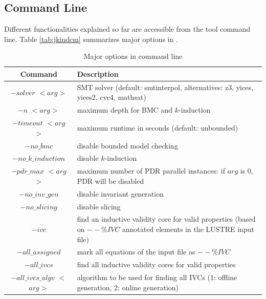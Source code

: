\subsection{Command Line}
Different \jkind functionalities explained so far are accessible from the tool command line. Table \ref{tab:jkindcm} summarizes major options in \jkind.

\begin{table}
  \caption{Major options in \jkind command line}
   \vspace{-0.1in}
  \centering
\begin{tabularx}{\linewidth}{|c|L|}
\hline
    Command & Description\\
  \hline\hline
  \small{$-solver $ $<$$arg$$>$} & \small{SMT solver (default: smtinterpol, alternatives: z3, yices, yices2, cvc4, mathsat)}\\[0.1ex]\hline
  \small{$-n $ $<$$arg$$>$ } & \small{maximum depth for BMC and $k$-induction} \\[0.1ex]
 \small{ $-timeout $ $<$$arg$$>$ }& \small{maximum runtime in seconds (default: unbounded)}\\[0.1ex]\hline
  \small{$-no\_bmc$} & \small{disable bounded model checking} \\
  \small{$-no\_k\_induction $} & \small{ disable $k$-induction} \\
  \small{$-pdr\_max$ $<$$arg$$>$} &\small{ maximum number of PDR parallel instances: if $arg$ is 0, PDR will be disabled} \\[0.1ex]
  \small{$-no\_inv\_gen $} & \small{disable invariant generation} \\
  \small{$-no\_slicing $} & \small{disable slicing} \\[0.1ex]\hline
  \small{$-ivc$ }& \small{find an inductive validity core for valid properties (based on $--\%IVC$ annotated  elements in the LUSTRE input file)} \\
  \small{$-all\_assigned$} & \small{mark all equations of the input file as $--\%IVC$} \\
  \small{$-all\_ivcs$} & \small{find all inductive validity cores for valid  properties}\\
  \small{$-all\_ivcs\_algv$ $<$$arg$$>$ }& \small{algorithm to be used for finding all IVCs (1: offline generation, 2: online generation)} \\

\end{tabularx}
\end{table}
